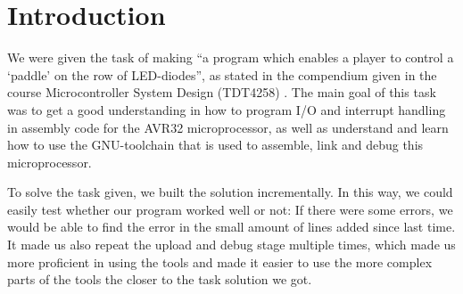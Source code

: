 \section{Introduction}

We were given the task of making ``a program which enables a player to
control a `paddle' on the row of LED-diodes'', as stated in the
compendium given in the course Microcontroller System Design (TDT4258)
\cite{comp}. The main goal of this task was to get a good understanding
in how to program I/O and interrupt handling in assembly code for the
AVR32 microprocessor, as well as understand and learn how to use the
GNU-toolchain that is used to assemble, link and debug this
microprocessor.

To solve the task given, we built the solution incrementally. In this
way, we could easily test whether our program worked well or not: If
there were some errors, we would be able to find the error in the small
amount of lines added since last time. It made us also repeat the upload
and debug stage multiple times, which made us more proficient in using
the tools and made it easier to use the more complex parts of the tools
the closer to the task solution we got. 
